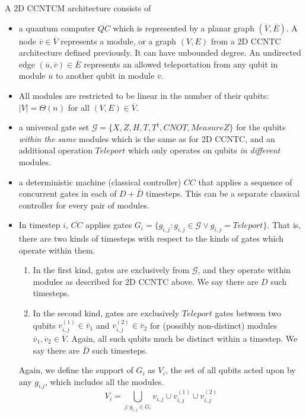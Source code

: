 \documentclass[twoside]{article}
\begin{document}
\begin{definition}
A \textsc{2D CCNTCM} architecture consists of

\begin{itemize}
\item a quantum computer $\overline{QC}$ which is represented by a planar graph $(\overline{V},\overline{E})$. A
node $\overline{v} \in \overline{V}$ represents a module, or a graph $(V,E)$
from a \textsc{2D CCNTC} architecture defined previously. It can have
unbounded degree.
An
undirected edge $(\overline{u},\overline{v}) \in \overline{E}$ represents an
allowed teleportation from any qubit in module $\overline{u}$ to
another qubit in module $\overline{v}$.
\item All modules are restricted to be linear in the number of their qubits:
$|V| = \Theta(n)$ for all $(V,E) \in \overline{V}$.
\item a universal gate set $\mathcal{G} = \{X, Z, H, T, T^{\dagger}, CNOT,
MeasureZ\}$
for the qubits \emph{within the same} modules which is the same as for \textsc{2D CCNTC},
and an additional operation $Teleport$ which only operates on qubits
\emph{in
different} modules.
\item a deterministic machine (classical controller) $\overline{CC}$ that applies a sequence
of concurrent gates in each of $D+\overline{D}$ timesteps.
This can be a separate classical controller
for every pair of modules.
\item In timestep $i$, $\overline{CC}$ applies
gates $G_i = \{g_{i,j} : g_{i,j} \in \mathcal{G} \lor g_{i,j} = Teleport \}$.
That is, there are two kinds of timesteps with respect to the kinds of gates
which operate within them.
\begin{enumerate}
\item In the first kind, gates are exclusively from $\mathcal{G}$, and
they operate within modules as described
for \textsc{2D CCNTC} above. We say there are $D$ such timesteps.
\item In the second kind, gates are exclusively $Teleport$ gates between two qubits $v^{(1)}_{i,j} \in \overline{v}_1$ and
$v^{(2)}_{i,j} \in \overline{v}_2$ for
(possibly non-distinct) modules $\overline{v}_1, \overline{v}_2 \in \overline{V}$.
Again, all such qubits much be distinct within a timestep.
We say there are $\overline{D}$ such timesteps.
\end{enumerate}

Again, we define the support of $G_i$
as $V_i$, the set of all qubits acted upon by any $g_{i.j}$, which
includes all the modules.
\begin{equation}
V_i = \bigcup_{j: g_{i,j} \in G_i} v_{i,j} \cup v^{(1)}_{i,j} \cup v^{(2)}_{i,j} 
\end{equation}

\end{itemize}
\end{definition}
\end{document}
